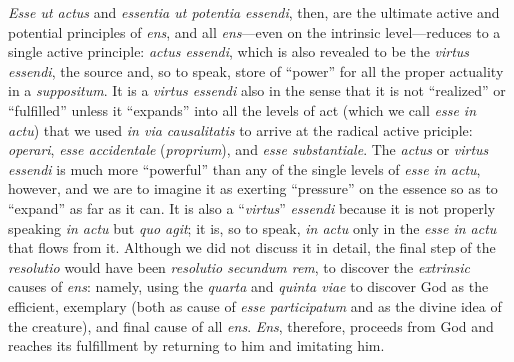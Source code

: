 \emph{Esse ut actus} and \emph{essentia ut potentia essendi}, then, are the ultimate active and potential principles of \emph{ens}, and all \emph{ens}—even on the intrinsic level—reduces to a single active principle: \emph{actus essendi}, which is also revealed to be the \emph{virtus essendi}, the source and, so to speak, store of “power” for all the proper actuality in a \emph{suppositum}. It is a \emph{virtus essendi} also in the sense that it is not “realized” or “fulfilled” unless it “expands” into all the levels of act (which we call \emph{esse in actu}) that we used \emph{in via causalitatis} to arrive at the radical active priciple: \emph{operari}, \emph{esse accidentale} (\emph{proprium}), and \emph{esse substantiale}. The \emph{actus} or \emph{virtus essendi} is much more “powerful” than any of the single levels of \emph{esse in actu}, however, and we are to imagine it as exerting “pressure” on the essence so as to “expand” as far as it can. It is also a “\emph{virtus}” \emph{essendi} because it is not properly speaking \emph{in actu} but \emph{quo agit}; it is, so to speak, \emph{in actu} only in the \emph{esse in actu} that flows from it. Although we did not discuss it in detail, the final step of the \emph{resolutio} would have been \emph{resolutio secundum rem}, to discover the \emph{extrinsic} causes of \emph{ens}: namely, using the \emph{quarta} and \emph{quinta viae} to discover God as the efficient, exemplary (both as cause of \emph{esse participatum} and as the divine idea of the creature), and final cause of all \emph{ens}. \emph{Ens}, therefore, proceeds from God and reaches its fulfillment by returning to him and imitating him. 

